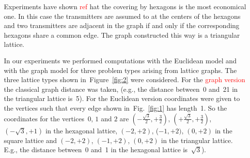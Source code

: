 \documentclass[smallextended]{svjour3}
\newcommand\ToDo[1]{\textcolor{red}{#1}}
\begin{document}


Experiments have shown \ToDo{ref} hat the covering by hexagons is the most economical one.
In this case the transmitters are assumed to at the centers of the hexagons
and two transmitters are adjacent in the graph
if and only if the corresponding hexagons share a common
edge. The graph constructed this way is a triangular lattice. 

In our experiments we performed computations with the Euclidean model and with
the graph model for three problem types arising from lattice graphs.
The three lattice types shown in~Figure~\ref{fig:2} were considered.
For the \ToDo{graph version} the classical graph distance was taken,
(e.g., the distance between~0 and~21 in the triangular lattice is~5).
For the Euclidean version coordinates were given to the vertices such
that every edge shown in~Fig.~\ref{fig:1} has length~1.
So the coordinates for the vertices~$0$, $1$ and $2$ are 
$(-\frac{\sqrt{3}}{2},+\frac{3}{2})$, $(+\frac{\sqrt{3}}{2},+\frac{3}{2})$,
$(-\sqrt{3},+1)$ in the hexagonal lattice,
$(-2,+2)$, ($-1,+2)$, $(0,+2)$ in the square lattice and
$(-2,+2)$, $(-1,+2)$, $(0,+2)$ in the triangular lattice.
E.g., the distance between~0 and~1 in the hexagonal lattice is~$\sqrt{3}$).
\end{document}
